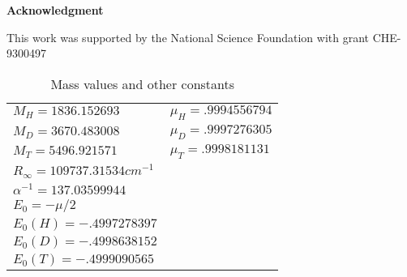 \documentclass[12pt,thmsa]{article}
\begin{document}
\noindent \textbf{Acknowledgment}

This work was supported by the National Science Foundation with grant
CHE-9300497




\newpage

\begin{table}[t] \centering%
\begin{tabular}{ll}
\hline\hline
$M_H=1836.152693$ & $\mu _H=.9994556794$ \\ 
$M_D=3670.483008$ & $\mu _D=.9997276305$ \\ 
$M_T=5496.921571$ & $\mu _T=.9998181131$ \\ \hline
$R_\infty =109737.31534cm^{-1}$ &  \\ 
$\alpha ^{-1}=137.03599944$ &  \\ \hline
$E_0=-\mu /2$ &  \\ 
$E_0\left( H\right) =-.4997278397$ &  \\ 
$E_0\left( D\right) =-.4998638152$ &  \\ 
$E_0\left( T\right) =-.4999090565$ &  \\ \hline\hline
\end{tabular}
\caption{Mass values and other constants \label{masstab}}%
\end{table}%

\newpage
\end{document}

